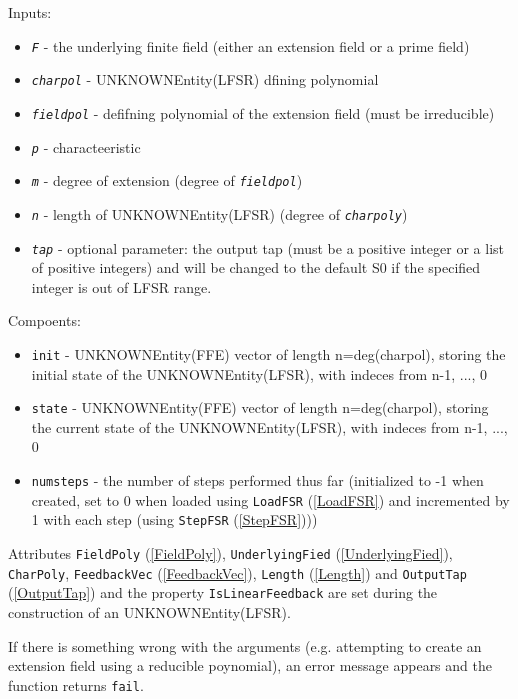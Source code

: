 \documentclass[a4paper,11pt]{report}
\begin{document}
{{{ Inputs: 
\begin{itemize}
\item  \mbox{\texttt{\mdseries\slshape F}} - the underlying finite field (either an extension field or a prime field)
\item  \mbox{\texttt{\mdseries\slshape charpol}} - UNKNOWNEntity(LFSR) dfining polynomial 
\item  \mbox{\texttt{\mdseries\slshape fieldpol}} - defifning polynomial of the extension field (must be irreducible)
\item  \mbox{\texttt{\mdseries\slshape p}} - characteeristic 
\item  \mbox{\texttt{\mdseries\slshape m}} - degree of extension (degree of \mbox{\texttt{\mdseries\slshape fieldpol}}) 
\item  \mbox{\texttt{\mdseries\slshape n}} - length of UNKNOWNEntity(LFSR) (degree of \mbox{\texttt{\mdseries\slshape charpoly}})
\item  \mbox{\texttt{\mdseries\slshape tap}} - optional parameter: the output tap (must be a positive integer or a list of
positive integers) and will be changed to the default S{\textunderscore}0 if
the specified integer is out of LFSR range.
\end{itemize}
 Compoents: 
\begin{itemize}
\item  \texttt{init} - UNKNOWNEntity(FFE) vector of length n=deg(charpol), storing the initial
state of the UNKNOWNEntity(LFSR), with indeces from n-1, ..., 0
\item  \texttt{state} - UNKNOWNEntity(FFE) vector of length n=deg(charpol), storing the current
state of the UNKNOWNEntity(LFSR), with indeces from n-1, ..., 0
\item  \texttt{numsteps} - the number of steps performed thus far (initialized to -1 when created, set
to 0 when loaded using \texttt{LoadFSR} (\ref{LoadFSR}) and incremented by 1 with each step (using \texttt{StepFSR} (\ref{StepFSR}))) 
\end{itemize}
 Attributes \texttt{FieldPoly} (\ref{FieldPoly}), \texttt{UnderlyingFied} (\ref{UnderlyingFied}), \texttt{CharPoly}, \texttt{FeedbackVec} (\ref{FeedbackVec}), \texttt{Length} (\ref{Length}) and \texttt{OutputTap} (\ref{OutputTap}) and the property \texttt{IsLinearFeedback} are set during the construction of an UNKNOWNEntity(LFSR). 

 If there is something wrong with the arguments (e.g. attempting to create an
extension field using a reducible poynomial), an error message appears and the
function returns \texttt{fail}. }

}}
\end{document}
